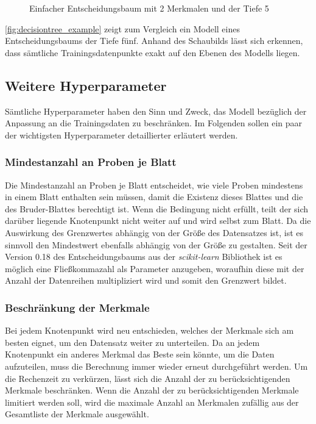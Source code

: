 \documentclass[12pt, a4paper]{article}
\begin{document}
\begin{figure}[H]
\centering
\def\svgwidth{350pt}

\caption{Einfacher Entscheidungsbaum mit 2 Merkmalen und der Tiefe 5}
\label{fig:decisiontree_example}
\end {figure}

\autoref{fig:decisiontree_example} zeigt zum Vergleich ein Modell eines Entscheidungsbaums der Tiefe fünf. Anhand des Schaubilds lässt sich erkennen, dass sämtliche Trainingsdatenpunkte exakt auf den Ebenen des Modells liegen. 

\subsection{Weitere Hyperparameter}

Sämtliche Hyperparameter haben den Sinn und Zweck, das Modell bezüglich der Anpassung an die Trainingsdaten zu beschränken. Im Folgenden sollen ein paar der wichtigsten Hyperparameter detaillierter erläutert werden.

\subsubsection{Mindestanzahl an Proben je Blatt} 

Die Mindestanzahl an Proben je Blatt entscheidet, wie viele Proben mindestens in einem Blatt enthalten sein müssen, damit die Existenz dieses Blattes und die des Bruder-Blattes berechtigt ist. Wenn die Bedingung nicht erfüllt, teilt der sich darüber liegende Knotenpunkt nicht weiter auf und wird selbst zum Blatt. Da die Auswirkung des Grenzwertes abhängig von der Größe des Datensatzes ist, ist es sinnvoll den Mindestwert ebenfalls abhängig von der Größe zu gestalten. Seit der Version 0.18 des Entscheidungsbaums aus der \textit{scikit-learn} Bibliothek ist es möglich eine Fließkommazahl als Parameter anzugeben, woraufhin diese mit der Anzahl der Datenreihen multipliziert wird und somit den Grenzwert bildet.

\subsubsection{Beschränkung der Merkmale}

Bei jedem Knotenpunkt wird neu entschieden, welches der Merkmale sich am besten eignet, um den Datensatz weiter zu unterteilen. Da an jedem Knotenpunkt ein anderes Merkmal das Beste sein könnte, um die Daten aufzuteilen, muss die Berechnung immer wieder erneut durchgeführt werden. Um die Rechenzeit zu verkürzen, lässt sich die Anzahl der zu berücksichtigenden Merkmale beschränken. Wenn die Anzahl der zu berücksichtigenden Merkmale limitiert werden soll, wird die maximale Anzahl an Merkmalen zufällig aus der Gesamtliste der Merkmale ausgewählt. 
\end{document}
